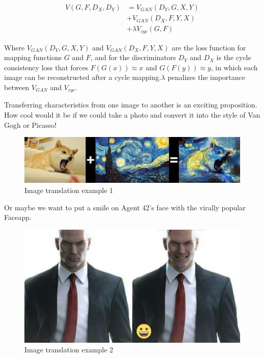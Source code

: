 \documentclass[peerreview]{IEEEtran}
\begin{document}
\begin{equation}
    \begin{split}
         V(G, F, D_X, D_Y) & = V_{GAN}(D_Y, G, X, Y) \\
         & + V_{GAN}(D_X, F, Y, X) \\
         & + \lambda V_{cyc}(G, F)
    \end{split}
\end{equation}

Where $V_{GAN}(D_Y, G, X, Y)$ and $V_{GAN}(D_X, F, Y, X)$ are the loss function for mapping functions $G$ and $F$, and for the discriminators $D_Y$ and $D_X$ is the cycle consistency loss that forces $F(G(x)) \approx x$ and $G(F(y)) \approx y$, in which each image can be reconstructed after a cycle mapping.$\lambda$ penalizes the importance between $V_{GAN}$ and $V_{cyc}$.

Transferring characteristics from one image to another is an exciting proposition. How cool would it be if we could take a photo and convert it into the style of Van Gogh or Picasso!

\begin{figure}[H]
    \centering
    \includegraphics[width=0.8\columnwidth]{doge_starrynight}
    \caption{Image translation example 1}
    \label{fig:s=doge_starry}
\end{figure}

Or maybe we want to put a smile on Agent 42's face with the virally popular Faceapp.

\begin{figure}[H]
    \centering
    \includegraphics[width=0.8\columnwidth]{agent47}
    \caption{Image translation example 2}
    \label{fig:s=agent47}
\end{figure}
\end{document}
